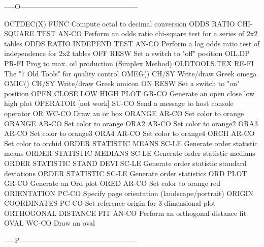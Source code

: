 -----O--------------------------------------------------

OCTDEC(X)                   FUNC  Compute octal to decimal conversion
ODDS RATIO CHI-SQUARE TEST  AN-CO Perform an odds ratio chi-square test for a series of 2x2 tables
ODDS RATIO INDEPEND TEST    AN-CO Perform a log odds ratio test of independence for 2x2 tables
OFF                         RESW  Set a switch to "off" position
OIL.DP                      PR-FI Prog to max. oil production (Simplex Method)
OLDTOOLS.TEX                RE-FI The "7 Old Tools" for quality control
OMEG()                      CH/SY Write/draw Greek omega
OMIC()                      CH/SY Write/draw Greek omicon
ON                          RESW  Set a switch to "on" position
OPEN CLOSE LOW HIGH PLOT    GR-CO Generate an open close low high plot
OPERATOR     [not work]     SU-CO Send a message to host console operator
OR                          WC-CO Draw an or box
ORANGE                      AR-CO Set color to orange
ORANGE                      AR-CO Set color to orange
ORA2                        AR-CO Set color to orange2
ORA3                        AR-CO Set color to orange3
ORA4                        AR-CO Set color to orange4
ORCH                        AR-CO Set color to orchid
ORDER STATISTIC MEANS       SC-LE Generate order statistic means
ORDER STATISTIC MEDIANS     SC-LE Generate order statistic medians
ORDER STATISTIC STAND DEVI  SC-LE Generate order statistic standard deviations
ORDER STATISTIC             SC-LE Generate order statistics
ORD PLOT                    GR-CO Generate an Ord plot
ORED                        AR-CO Set color to orange red
ORIENTATION                 PC-CO Specify page orientation (landscape/portrait)
ORIGIN COORDINATES          PC-CO Set reference origin for 3-dimensional plot
ORTHOGONAL DISTANCE FIT     AN-CO Perform an orthogonal distance fit
OVAL                        WC-CO Draw an oval

-----P--------------------------------------------------

